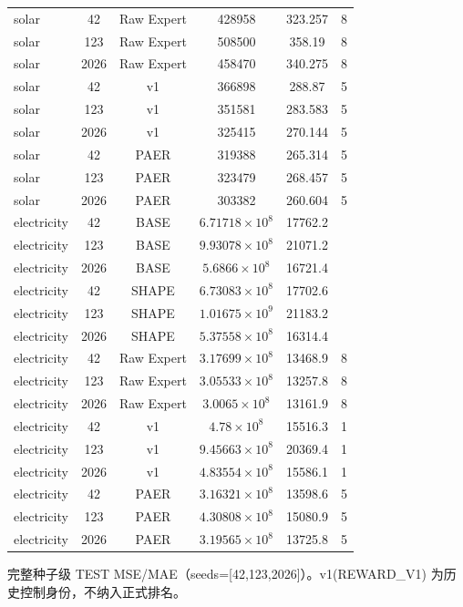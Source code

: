 \begin{table}[htbp]
\begin{tabular}{lccccc}
    solar & 42 & Raw Expert & 428958 & 323.257 & 8 \\
    solar & 123 & Raw Expert & 508500 & 358.19 & 8 \\
    solar & 2026 & Raw Expert & 458470 & 340.275 & 8 \\
    solar & 42 & v1 & 366898 & 288.87 & 5 \\
    solar & 123 & v1 & 351581 & 283.583 & 5 \\
    solar & 2026 & v1 & 325415 & 270.144 & 5 \\
    solar & 42 & PAER & 319388 & 265.314 & 5 \\
    solar & 123 & PAER & 323479 & 268.457 & 5 \\
    solar & 2026 & PAER & 303382 & 260.604 & 5 \\
    electricity & 42 & BASE & $6.71718\times10^{8}$ & 17762.2 &  \\
    electricity & 123 & BASE & $9.93078\times10^{8}$ & 21071.2 &  \\
    electricity & 2026 & BASE & $5.6866\times10^{8}$ & 16721.4 &  \\
    electricity & 42 & SHAPE & $6.73083\times10^{8}$ & 17702.6 &  \\
    electricity & 123 & SHAPE & $1.01675\times10^{9}$ & 21183.2 &  \\
    electricity & 2026 & SHAPE & $5.37558\times10^{8}$ & 16314.4 &  \\
    electricity & 42 & Raw Expert & $3.17699\times10^{8}$ & 13468.9 & 8 \\
    electricity & 123 & Raw Expert & $3.05533\times10^{8}$ & 13257.8 & 8 \\
    electricity & 2026 & Raw Expert & $3.0065\times10^{8}$ & 13161.9 & 8 \\
    electricity & 42 & v1 & $4.78\times10^{8}$ & 15516.3 & 1 \\
    electricity & 123 & v1 & $9.45663\times10^{8}$ & 20369.4 & 1 \\
    electricity & 2026 & v1 & $4.83554\times10^{8}$ & 15586.1 & 1 \\
    electricity & 42 & PAER & $3.16321\times10^{8}$ & 13598.6 & 5 \\
    electricity & 123 & PAER & $4.30808\times10^{8}$ & 15080.9 & 5 \\
    electricity & 2026 & PAER & $3.19565\times10^{8}$ & 13725.8 & 5 \\
    \bottomrule
  \end{tabular}
  {\footnotesize 完整种子级 TEST MSE/MAE（seeds=[42,123,2026]）。v1(REWARD\_V1) 为历史控制身份，不纳入正式排名。}
\end{table}
